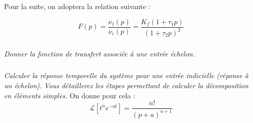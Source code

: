 \documentclass[11pt,oneside]{article}
\begin{document}
Pour la suite, on adoptera la relation suivante :

$$
F(p)=\dfrac{\nu_1(p)}{\nu_c(p)}=\dfrac{K_f\left( 1+\tau_1 p\right)}{\left( 1+\tau_2 p\right)^2}
$$

\subparagraph{}
\textit{Donner la fonction de transfert associée à une entrée échelon.}




\subparagraph{}
\textit{Calculer la réponse temporelle du système pour une entrée indicielle (réponse à un échelon).}
\textit{Vous détaillerez les étapes permettant de calculer la décomposition en éléments simples.}
On donne pour cela :
$$
\mathcal{L}\left[ t^n e^{-at} \right] = \dfrac{n!}{(p+a)^{n+1}}
$$
\end{document}
